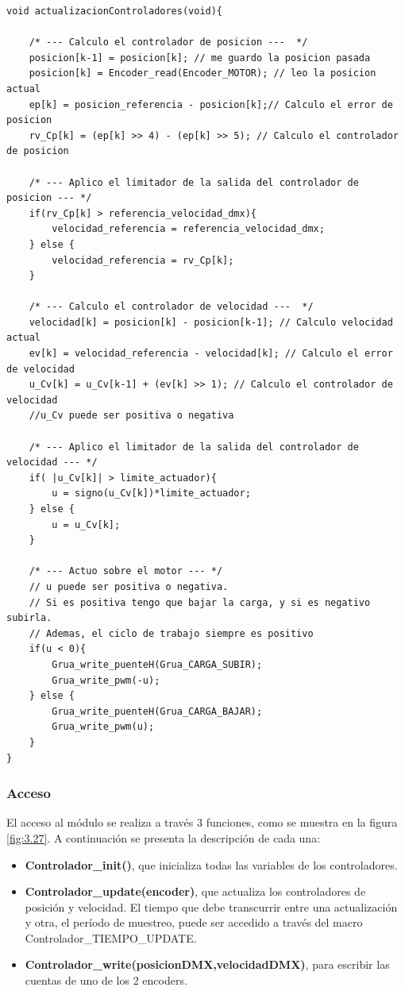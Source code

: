 \begin{lstlisting}[style=CStyle]
void actualizacionControladores(void){

	/* --- Calculo el controlador de posicion ---  */
	posicion[k-1] = posicion[k]; // me guardo la posicion pasada
	posicion[k] = Encoder_read(Encoder_MOTOR); // leo la posicion actual
	ep[k] = posicion_referencia - posicion[k];// Calculo el error de posicion
	rv_Cp[k] = (ep[k] >> 4) - (ep[k] >> 5); // Calculo el controlador de posicion
	
	/* --- Aplico el limitador de la salida del controlador de posicion --- */
	if(rv_Cp[k] > referencia_velocidad_dmx){
		velocidad_referencia = referencia_velocidad_dmx;
	} else {
		velocidad_referencia = rv_Cp[k];
	}
	
	/* --- Calculo el controlador de velocidad ---  */
	velocidad[k] = posicion[k] - posicion[k-1]; // Calculo velocidad actual
	ev[k] = velocidad_referencia - velocidad[k]; // Calculo el error de velocidad
	u_Cv[k] = u_Cv[k-1] + (ev[k] >> 1); // Calculo el controlador de velocidad
	//u_Cv puede ser positiva o negativa
	
	/* --- Aplico el limitador de la salida del controlador de velocidad --- */
	if( |u_Cv[k]| > limite_actuador){
		u = signo(u_Cv[k])*limite_actuador;
	} else {
		u = u_Cv[k];
	}
	
	/* --- Actuo sobre el motor --- */
	// u puede ser positiva o negativa. 
	// Si es positiva tengo que bajar la carga, y si es negativo subirla.
	// Ademas, el ciclo de trabajo siempre es positivo
	if(u < 0){
		Grua_write_puenteH(Grua_CARGA_SUBIR);
		Grua_write_pwm(-u);
	} else {
		Grua_write_puenteH(Grua_CARGA_BAJAR);
		Grua_write_pwm(u);
	}
}
\end{lstlisting}

\subsubsection{Acceso}
El acceso al módulo se realiza a través 3 funciones, como se muestra en la figura \ref{fig:3.27}. A continuación se presenta la descripción de cada una:
\begin{itemize}
	\item \textbf{Controlador\_init()}, que inicializa todas las variables de los controladores.
	\item \textbf{Controlador\_update(encoder)}, que actualiza los controladores de posición y velocidad. El tiempo que debe transcurrir entre una actualización y otra, el período de muestreo, puede ser accedido a través del macro Controlador\_TIEMPO\_UPDATE.
	\item \textbf{Controlador\_write(posicionDMX,velocidadDMX)}, para escribir las cuentas de uno de los 2 encoders.
\end{itemize}

